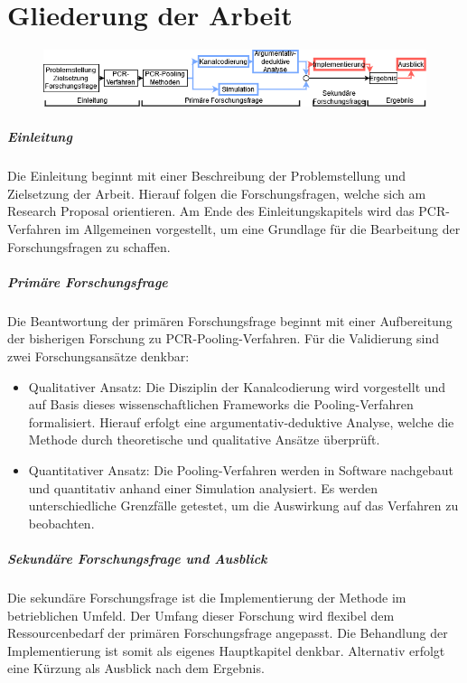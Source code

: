 
\chapter{Gliederung der Arbeit}
\begin{figure}[h]
	\centering
	\includegraphics[height=.15\textwidth]{images/Untitled Diagram.drawio}
\end{figure}

\paragraph{Einleitung}
Die Einleitung beginnt mit einer Beschreibung der Problemstellung und Zielsetzung der Arbeit.
Hierauf folgen die Forschungsfragen, welche sich am Research Proposal orientieren.
Am Ende des Einleitungskapitels wird das PCR-Verfahren im Allgemeinen vorgestellt, um eine Grundlage für die Bearbeitung der Forschungsfragen zu schaffen.

\paragraph{Primäre Forschungsfrage}
Die Beantwortung der primären Forschungsfrage beginnt mit einer Aufbereitung der bisherigen Forschung zu PCR-Pooling-Verfahren.
Für die Validierung sind zwei Forschungsansätze denkbar:
\begin{itemize}
	\setlength{\itemsep}{-8pt}
	\item Qualitativer Ansatz:
				Die Disziplin der Kanalcodierung wird vorgestellt und auf Basis dieses wissenschaftlichen Frameworks die Pooling-Verfahren formalisiert.
				Hierauf erfolgt eine argumentativ-deduktive Analyse, welche die Methode durch theoretische und qualitative Ansätze überprüft.
	\item Quantitativer Ansatz:
				Die Pooling-Verfahren werden in Software nachgebaut und quantitativ anhand einer Simulation analysiert.
				Es werden unterschiedliche Grenzfälle getestet, um die Auswirkung auf das Verfahren zu beobachten.
\end{itemize}

\paragraph{Sekundäre Forschungsfrage und Ausblick}
Die sekundäre Forschungsfrage ist die Implementierung der Methode im betrieblichen Umfeld.
Der Umfang dieser Forschung wird flexibel dem Ressourcenbedarf der primären Forschungsfrage angepasst.
Die Behandlung der Implementierung ist somit als eigenes Hauptkapitel denkbar.
Alternativ erfolgt eine Kürzung als Ausblick nach dem Ergebnis.

